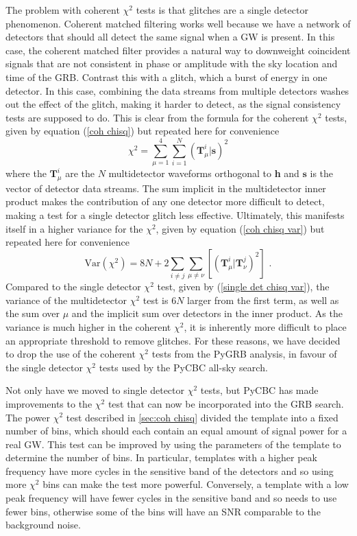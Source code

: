 \documentclass[11pt]{cuthesis}
\newcommand{\fs}{\text{ .}}
\begin{document}
The problem with coherent $\chi^2$ tests is that glitches are a single detector phenomenon. Coherent matched filtering works well because we have a network of detectors that should all detect the same signal when a GW is present. In this case, the coherent matched filter provides a natural way to downweight coincident signals that are not consistent in phase or amplitude with the sky location and time of the GRB. Contrast this with a glitch, which a burst of energy in one detector. In this case, combining the data streams from multiple detectors washes out the effect of the glitch, making it harder to detect, as the signal consistency tests are supposed to do. This is clear from the formula for the coherent $\chi^2$ tests, given by equation (\ref{coh chisq}) but repeated here for convenience
\begin{equation}
\chi^2 = \sum_{\mu=1}^4 \sum_{i=1}^N (\textbf{T}^i_\mu | \textbf{s})^2 
\end{equation}
where the $\textbf{T}^i_\mu$ are the $N$ multidetector waveforms orthogonal to \textbf{h} and $\textbf{s}$ is the vector of detector data streams.
The sum implicit in the multidetector inner product makes the contribution of any one detector more difficult to detect, making a test for a single detector glitch less effective. Ultimately, this manifests itself in a higher variance for the $\chi^2$, given by equation (\ref{coh chisq var}) but repeated here for convenience 
\begin{equation}
\text{Var}(\chi^2) = 8N + 2\sum_{i \neq j} \sum_{\mu\neq\nu} [(\textbf{T}^i_\mu | \textbf{T}^j_\nu)^2 ] \fs
\end{equation}
Compared to the single detector $\chi^2$ test, given by (\ref{single det chisq var}), the variance of the multidetector $\chi^2$ test is $6N$ larger from the first term, as well as the sum over $\mu$ and the implicit sum over detectors in the inner product. As the variance is much higher in the coherent $\chi^2$, it is inherently more difficult to place an appropriate threshold to remove glitches. For these reasons, we have decided to drop the use of the coherent $\chi^2$ tests from the PyGRB analysis, in favour of the single detector $\chi^2$ tests used by the PyCBC all-sky search.

Not only have we moved to single detector $\chi^2$ tests, but PyCBC has made improvements to the $\chi^2$ test that can now be incorporated into the GRB search. The power $\chi^2$ test described in \ref{sec:coh chisq} divided the template into a fixed number of bins, which should each contain an equal amount of signal power for a real GW. This test can be improved by using the parameters of the template to determine the number of bins. In particular, templates with a higher peak frequency have more cycles in the sensitive band of the detectors and so using more $\chi^2$ bins can make the test more powerful. Conversely, a template with a low peak frequency will have fewer cycles in the sensitive band and so needs to use fewer bins, otherwise some of the bins will have an SNR comparable to the background noise. 
\end{document}

